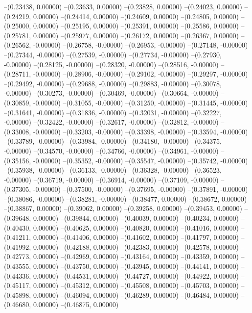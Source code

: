 --(0.23438, 0.00000)
--(0.23633, 0.00000)
--(0.23828, 0.00000)
--(0.24023, 0.00000)
--(0.24219, 0.00000)
--(0.24414, 0.00000)
--(0.24609, 0.00000)
--(0.24805, 0.00000)
--(0.25000, 0.00000)
--(0.25195, 0.00000)
--(0.25391, 0.00000)
--(0.25586, 0.00000)
--(0.25781, 0.00000)
--(0.25977, 0.00000)
--(0.26172, 0.00000)
--(0.26367, 0.00000)
--(0.26562, -0.00000)
--(0.26758, -0.00000)
--(0.26953, -0.00000)
--(0.27148, -0.00000)
--(0.27344, -0.00000)
--(0.27539, -0.00000)
--(0.27734, -0.00000)
--(0.27930, -0.00000)
--(0.28125, -0.00000)
--(0.28320, -0.00000)
--(0.28516, -0.00000)
--(0.28711, -0.00000)
--(0.28906, -0.00000)
--(0.29102, -0.00000)
--(0.29297, -0.00000)
--(0.29492, -0.00000)
--(0.29688, -0.00000)
--(0.29883, -0.00000)
--(0.30078, -0.00000)
--(0.30273, -0.00000)
--(0.30469, -0.00000)
--(0.30664, -0.00000)
--(0.30859, -0.00000)
--(0.31055, -0.00000)
--(0.31250, -0.00000)
--(0.31445, -0.00000)
--(0.31641, -0.00000)
--(0.31836, -0.00000)
--(0.32031, -0.00000)
--(0.32227, -0.00000)
--(0.32422, -0.00000)
--(0.32617, -0.00000)
--(0.32812, -0.00000)
--(0.33008, -0.00000)
--(0.33203, -0.00000)
--(0.33398, -0.00000)
--(0.33594, -0.00000)
--(0.33789, -0.00000)
--(0.33984, -0.00000)
--(0.34180, -0.00000)
--(0.34375, -0.00000)
--(0.34570, -0.00000)
--(0.34766, -0.00000)
--(0.34961, -0.00000)
--(0.35156, -0.00000)
--(0.35352, -0.00000)
--(0.35547, -0.00000)
--(0.35742, -0.00000)
--(0.35938, -0.00000)
--(0.36133, -0.00000)
--(0.36328, -0.00000)
--(0.36523, -0.00000)
--(0.36719, -0.00000)
--(0.36914, -0.00000)
--(0.37109, -0.00000)
--(0.37305, -0.00000)
--(0.37500, -0.00000)
--(0.37695, -0.00000)
--(0.37891, -0.00000)
--(0.38086, -0.00000)
--(0.38281, -0.00000)
--(0.38477, 0.00000)
--(0.38672, 0.00000)
--(0.38867, 0.00000)
--(0.39062, 0.00000)
--(0.39258, 0.00000)
--(0.39453, 0.00000)
--(0.39648, 0.00000)
--(0.39844, 0.00000)
--(0.40039, 0.00000)
--(0.40234, 0.00000)
--(0.40430, 0.00000)
--(0.40625, 0.00000)
--(0.40820, 0.00000)
--(0.41016, 0.00000)
--(0.41211, 0.00000)
--(0.41406, 0.00000)
--(0.41602, 0.00000)
--(0.41797, 0.00000)
--(0.41992, 0.00000)
--(0.42188, 0.00000)
--(0.42383, 0.00000)
--(0.42578, 0.00000)
--(0.42773, 0.00000)
--(0.42969, 0.00000)
--(0.43164, 0.00000)
--(0.43359, 0.00000)
--(0.43555, 0.00000)
--(0.43750, 0.00000)
--(0.43945, 0.00000)
--(0.44141, 0.00000)
--(0.44336, 0.00000)
--(0.44531, 0.00000)
--(0.44727, 0.00000)
--(0.44922, 0.00000)
--(0.45117, 0.00000)
--(0.45312, 0.00000)
--(0.45508, 0.00000)
--(0.45703, 0.00000)
--(0.45898, 0.00000)
--(0.46094, 0.00000)
--(0.46289, 0.00000)
--(0.46484, 0.00000)
--(0.46680, 0.00000)
--(0.46875, 0.00000)
